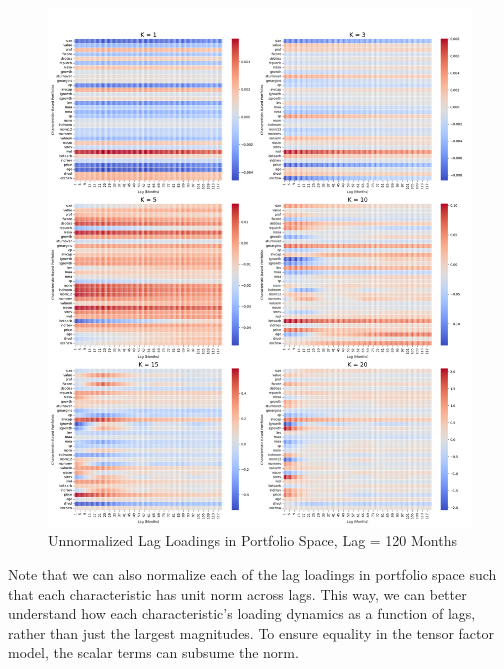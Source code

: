 \documentclass{article}
\begin{document}
\begin{figure}[H]
    \centering
    \includegraphics[width=1\linewidth]{WB_120_unnorm.png}
    \caption{Unnormalized Lag Loadings in Portfolio Space, Lag = 120 Months}
    \label{fig:WB_120}
\end{figure}

Note that we can also normalize each of the lag loadings in portfolio space such that 
each characteristic has unit norm across lags. This way, we can better understand how each 
characteristic's loading dynamics as a function of lags, rather than just the largest magnitudes. 
To ensure equality in the tensor factor model, the scalar terms can 
subsume the norm. 
\end{document}
